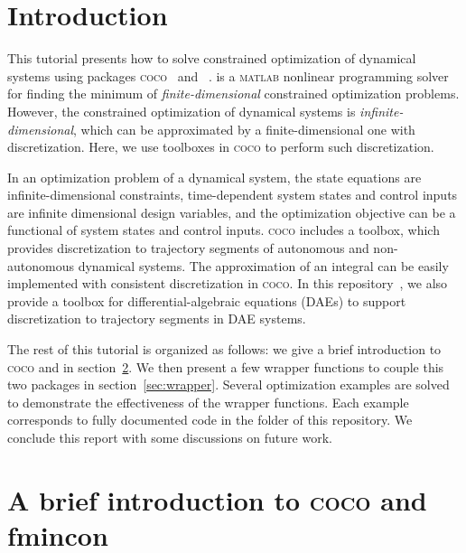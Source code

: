  

\section{Introduction}
This tutorial presents how to solve constrained optimization of dynamical systems using packages \textsc{coco}~\cite{coco,coco-recipes} and ~\cite{fmincon}.  is a \textsc{matlab} nonlinear programming solver for finding the minimum of \emph{finite-dimensional} constrained optimization problems. However, the constrained optimization of dynamical systems is \emph{infinite-dimensional}, which can be approximated by a finite-dimensional one with discretization. Here, we use toolboxes in \textsc{coco} to perform such discretization.

In an optimization problem of a dynamical system, the state equations are infinite-dimensional constraints, time-dependent system states and control inputs are infinite dimensional design variables, and the optimization objective can be a functional of system states and control inputs. \textsc{coco} includes a  toolbox, which provides discretization to trajectory segments of autonomous and non-autonomous dynamical systems. The approximation of an integral can be easily implemented with consistent discretization in \textsc{coco}. In this repository~\cite{wrapper}, we also provide a toolbox for differential-algebraic equations (DAEs) to support discretization to trajectory segments in DAE systems.

The rest of this tutorial is organized as follows: we give a brief introduction to \textsc{coco} and  in section~\ref{sec:coco-fmincon}. We then present a few wrapper functions to couple this two packages in section~\ref{sec:wrapper}. Several optimization examples are solved to demonstrate the effectiveness of the wrapper functions. Each example corresponds to fully documented code in the  folder of this repository. We conclude this report with some discussions on future work.


\section{A brief introduction to \textsc{coco} and fmincon}
\label{sec:coco-fmincon}
